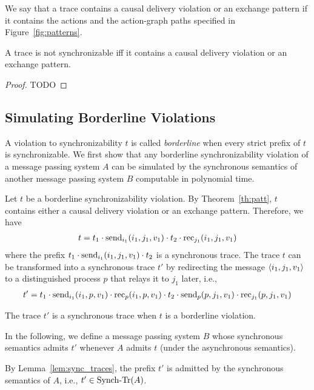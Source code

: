 We say that a trace contains a causal delivery violation or an exchange pattern if it contains the actions and the action-graph paths
specified in Figure~\ref{fig:patterns}.

\begin{theorem}\label{th:patt}
A trace is not synchronizable if{f} it contains a causal delivery violation or an exchange pattern.
\end{theorem}
\begin{proof}
TODO
\end{proof}

\subsection{Simulating Borderline Violations}

A violation to synchronizability $t$ is called \emph{borderline} when every strict prefix of $t$ is synchronizable.
We first show that any borderline synchronizability violation of a message passing system $A$ can be simulated by 
the synchronous semantics of another message passing system $B$ computable in polynomial time.

Let $t$ be a borderline synchronizability violation.
By Theorem~\ref{th:patt}, $t$ contains either a causal delivery violation or an exchange pattern.
Therefore, we have 
\begin{align*}
t=t_1\cdot \mathrm{send}_{i_1}({i_1,j_1,v_1}) \cdot t_2\cdot \mathrm{rec}_{j_1}({i_1,j_1,v_1})
\end{align*} 
where the prefix $t_1\cdot \mathrm{send}_{i_1}({i_1,j_1,v_1}) \cdot t_2$ is a synchronous trace.
The trace $t$ can be transformed into a synchronous trace $t'$ by redirecting the message $\left\langle {i_1,j_1,v_1} \right\rangle$ to
a distinguished process $p$ that relays it to $j_1$ later, i.e.,
\begin{align*}
t'=t_1\cdot \mathrm{send}_{i_1}({i_1,p,v_1})\cdot \mathrm{rec}_{p}({i_1,p,v_1}) \cdot t_2\cdot \mathrm{send}_{p}({p,j_1,v_1})\cdot \mathrm{rec}_{j_1}({p,j_1,v_1})
\end{align*} 

\begin{lemma}
The trace $t'$ is a synchronous trace when $t$ is a borderline violation.
\end{lemma}

In the following, we define a message passing system $B$ whose synchronous semantics admits $t'$ whenever 
$A$ admits $t$ (under the asynchronous semantics).

By Lemma~\ref{lem:sync_traces}, the prefix $t'$ is admitted by the 
synchronous semantics of $A$, i.e., $t'\in \mathrm{Synch}\text{-}\mathrm{Tr}(A)$.

